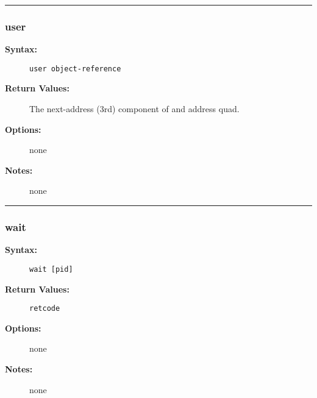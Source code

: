 \hrule
\subsubsection{user}

\begin{description}
\item[{\bf Syntax:}] \mbox{}

{\tt user object-reference}

\item[{\bf Return Values:}] \mbox{}

The next-address (3rd) component of 
and address quad.

\item[{\bf Options:}] \mbox{}

none  

\item[{\bf Notes:}] \mbox{}

none

\end{description}

\hrule
\subsubsection{wait}

\begin{description}
\item[{\bf Syntax:}] \mbox{}

{\tt wait [pid]}

\item[{\bf Return Values:}] \mbox{}

{\tt retcode}

\item[{\bf Options:}] \mbox{}

none  

\item[{\bf Notes:}] \mbox{}

none

\end{description}

